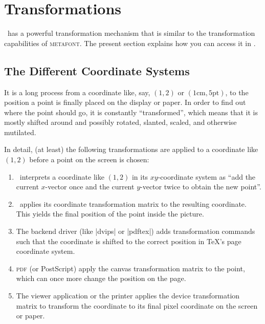 %
%
%


\section{Transformations}

\pgfname\ has a powerful transformation mechanism that is similar to the
transformation capabilities of \textsc{metafont}. The present section explains
how you can access it in \tikzname.


\subsection{The Different Coordinate Systems}

It is a long process from  a coordinate like, say, $(1,2)$ or
$(1\mathrm{cm},5\mathrm{pt})$, to the position a point is finally placed on the
display or paper. In order to find out where the point should go, it is
constantly ``transformed'', which means that it is mostly shifted around and
possibly rotated, slanted, scaled, and otherwise mutilated.

In detail, (at least) the following transformations are applied to a coordinate
like $(1,2)$ before a point on the screen is chosen:
%
\begin{enumerate}
    \item \pgfname\ interprets a coordinate like $(1,2)$  in its
        $xy$-coordinate system as ``add the current $x$-vector once and the
        current $y$-vector twice to obtain the new point''.
    \item \pgfname\ applies its coordinate transformation matrix to the
        resulting coordinate. This yields the final position of the point
        inside the picture.
    \item The backend driver (like |dvips| or |pdftex|) adds transformation
        commands such that the coordinate is shifted to the correct position in
        \TeX's page coordinate system.
    \item \textsc{pdf} (or PostScript) apply the canvas transformation matrix
        to the point, which can once more change the position on the page.
    \item The viewer application or the printer applies the device
        transformation matrix to transform the coordinate to its final pixel
        coordinate on the screen or paper.
\end{enumerate}

